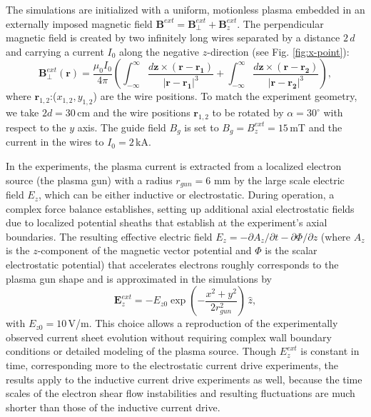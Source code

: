 \documentclass[aip,preprint]{revtex4-1}
\begin{document}
The simulations are initialized with a uniform, motionless plasma embedded in an externally imposed magnetic field $\mathbf{B}^{ext}=\mathbf{B}_{\perp}^{ext}+\mathbf{B}^{ext}_z$. The perpendicular magnetic field is created by two infinitely long wires separated by a distance $2\,d$ and carrying a current $I_0$ along the negative $z$-direction (see Fig. \ref{fig:x-point}):
\begin{equation}
\mathbf{B}^{ext}_\perp(\mathbf{r}) =
\frac{\mu_0I_0}{4\pi}
\left(\int_{-\infty}^{\infty} \frac{d\mathbf{z} \times (\mathbf{r}-\mathbf{r_1})}{|\mathbf{r}-\mathbf{r_1}|^3} + 
\int_{-\infty}^{\infty} \frac{d\mathbf{z} \times (\mathbf{r}-\mathbf{r_2})}{|\mathbf{r}-\mathbf{r_2}|^3}
\right),
\end{equation}
where $\mathbf{r}_{1,2}$:($x_{1,2},y_{1,2}$) are the wire positions. To match the experiment geometry, we take $2d=30\,$cm and the wire positions $\mathbf{r}_{1,2}$ to be rotated by $\alpha =30^\circ$ with respect to the $y$ axis. The guide field $B_g$ is set to $B_g=B_z^{ext}=15\,$mT and the current in the wires to $I_0=2$\,kA. 

In the experiments, the plasma current is extracted from a localized electron source (the plasma gun) with a radius $r_{gun}=6$ mm by the large scale electric field $E_z$, which can be either inductive or electrostatic. During operation, a complex force balance establishes, setting up additional axial electrostatic fields due to localized potential sheaths that establish at the experiment's axial boundaries.
The resulting effective electric field $E_z = -\partial A_z/\partial t-\partial\Phi/\partial z$ (where $A_z$ is the $z$-component of the magnetic vector potential and $\Phi$ is the scalar electrostatic potential)
that accelerates electrons roughly corresponds to the plasma gun shape and is approximated in the simulations by
\begin{equation}
\mathbf{E}_z^{ext}=-E_{z0}\exp\left(-\frac{x^2+y^2}{2r_{gun}^2}\right)\,\hat{z},
\end{equation} 
with $E_{z0}=10\,$V/m. This choice allows a reproduction of the experimentally observed current sheet evolution without requiring complex wall boundary conditions or detailed modeling of the plasma source.
 Though $E_z^{ext}$ is constant in time, corresponding more to the electrostatic  current drive experiments, the results apply to the inductive current drive experiments as well, because the time scales of the electron shear flow instabilities and resulting fluctuations  are much shorter than those of the inductive current drive.
\end{document}
